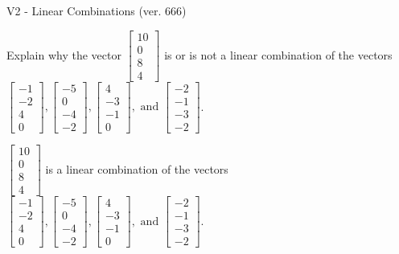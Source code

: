 \begin{exercise}
  \begin{exerciseTitle}V2 - Linear Combinations (ver. 666)\end{exerciseTitle}
  \begin{exerciseStatement}
    Explain why the vector \(\left[\begin{array}{c}
10 \\
0 \\
8 \\
4
\end{array}\right]\)  is or is not a linear 
	combination of the vectors \(\left[\begin{array}{c}
-1 \\
-2 \\
4 \\
0
\end{array}\right] , \left[\begin{array}{c}
-5 \\
0 \\
-4 \\
-2
\end{array}\right] , \left[\begin{array}{c}
4 \\
-3 \\
-1 \\
0
\end{array}\right] , \text{ and } \left[\begin{array}{c}
-2 \\
-1 \\
-3 \\
-2
\end{array}\right]\).
	


  \end{exerciseStatement}
  \begin{exerciseAnswer}
   \(\left[\begin{array}{c}
10 \\
0 \\
8 \\
4
\end{array}\right]\) 
  	 is  
	a linear combination of the vectors \(\left[\begin{array}{c}
-1 \\
-2 \\
4 \\
0
\end{array}\right] , \left[\begin{array}{c}
-5 \\
0 \\
-4 \\
-2
\end{array}\right] , \left[\begin{array}{c}
4 \\
-3 \\
-1 \\
0
\end{array}\right] , \text{ and } \left[\begin{array}{c}
-2 \\
-1 \\
-3 \\
-2
\end{array}\right]\).


\end{exerciseAnswer}
\end{exercise}
